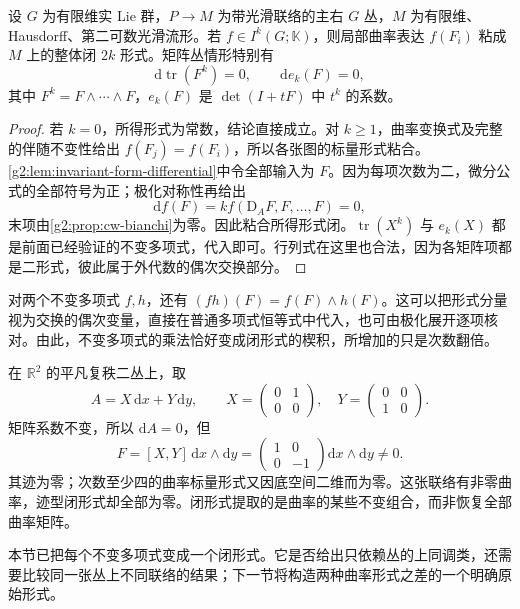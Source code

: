 \begin{theorem}\label{g2:thm:chern-weil-closed}
	设 \(G\) 为有限维实 Lie 群，\(P\to M\) 为带光滑联络的主右 \(G\) 丛，\(M\) 为有限维、Hausdorff、第二可数光滑流形。若 \(f\in I^k(G;\mathbb K)\)，则局部曲率表达 \(f(F_i)\) 粘成 \(M\) 上的整体闭 \(2k\) 形式。矩阵丛情形特别有
	\[
		\mathrm d\operatorname{tr}(F^k)=0,
		\qquad \mathrm d e_k(F)=0,
	\]
	其中 \(F^k=F\wedge\cdots\wedge F\)，\(e_k(F)\) 是 \(\det(I+tF)\) 中 \(t^k\) 的系数。
\end{theorem}
\begin{proof}
	若 \(k=0\)，所得形式为常数，结论直接成立。对 \(k\ge1\)，曲率变换式及完整的伴随不变性给出 \(f(F_j)=f(F_i)\)，所以各张图的标量形式粘合。\cref{g2:lem:invariant-form-differential}中令全部输入为 \(F\)。因为每项次数为二，微分公式的全部符号为正；极化对称性再给出
	\[
		\mathrm df(F)=k f(\mathrm D_AF,F,\ldots,F)=0,
	\]
	末项由\cref{g2:prop:cw-bianchi}为零。因此粘合所得形式闭。\(\operatorname{tr}(X^k)\) 与 \(e_k(X)\) 都是前面已经验证的不变多项式，代入即可。行列式在这里也合法，因为各矩阵项都是二形式，彼此属于外代数的偶次交换部分。
\end{proof}

对两个不变多项式 \(f,h\)，还有 \((fh)(F)=f(F)\wedge h(F)\)。这可以把形式分量视为交换的偶次变量，直接在普通多项式恒等式中代入，也可由极化展开逐项核对。由此，不变多项式的乘法恰好变成闭形式的楔积，所增加的只是次数翻倍。

\begin{example}\label{g2:exm:curvature-trace-zero-nonflat}
	在 \(\mathbb R^2\) 的平凡复秩二丛上，取
	\[
		A=X\,\mathrm dx+Y\,\mathrm dy,\qquad
		X=\begin{pmatrix}0&1\\0&0\end{pmatrix},\quad
		Y=\begin{pmatrix}0&0\\1&0\end{pmatrix}.
	\]
	矩阵系数不变，所以 \(\mathrm dA=0\)，但
	\[
		F=[X,Y]\,\mathrm dx\wedge\mathrm dy
		=\begin{pmatrix}1&0\\0&-1\end{pmatrix}\mathrm dx\wedge\mathrm dy\ne0.
	\]
	其迹为零；次数至少四的曲率标量形式又因底空间二维而为零。这张联络有非零曲率，迹型闭形式却全部为零。闭形式提取的是曲率的某些不变组合，而非恢复全部曲率矩阵。
\end{example}

本节已把每个不变多项式变成一个闭形式。它是否给出只依赖丛的上同调类，还需要比较同一张丛上不同联络的结果；下一节将构造两种曲率形式之差的一个明确原始形式。
